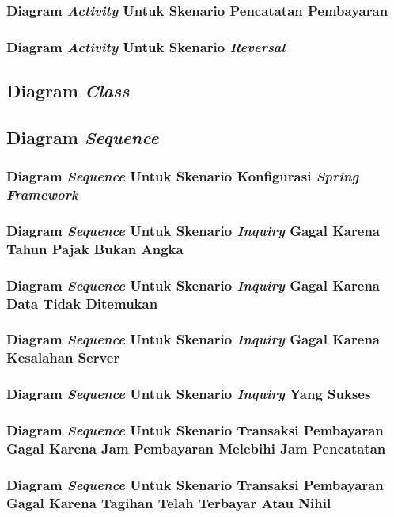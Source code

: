 \documentclass[pdftex,12pt, oneside]{article}
\begin{document}
\subsubsection{Diagram \textit{Activity} Untuk Skenario Pencatatan Pembayaran}
\subsubsection{Diagram \textit{Activity} Untuk Skenario \textit{Reversal}}
\subsection{Diagram \textit{Class}}
\subsection{Diagram \textit{Sequence}}
\subsubsection{Diagram \textit{Sequence} Untuk Skenario Konfigurasi \textit{Spring Framework}}
\subsubsection{Diagram \textit{Sequence} Untuk Skenario \textit{Inquiry} Gagal Karena Tahun Pajak Bukan Angka}
\subsubsection{Diagram \textit{Sequence} Untuk Skenario \textit{Inquiry} Gagal Karena Data Tidak Ditemukan}
\subsubsection{Diagram \textit{Sequence} Untuk Skenario \textit{Inquiry} Gagal Karena Kesalahan Server}
\subsubsection{Diagram \textit{Sequence} Untuk Skenario \textit{Inquiry} Yang Sukses}
\subsubsection{Diagram \textit{Sequence} Untuk Skenario Transaksi Pembayaran Gagal Karena Jam Pembayaran Melebihi Jam Pencatatan}
\subsubsection{Diagram \textit{Sequence} Untuk Skenario Transaksi Pembayaran Gagal Karena Tagihan Telah Terbayar Atau Nihil}
\end{document}
